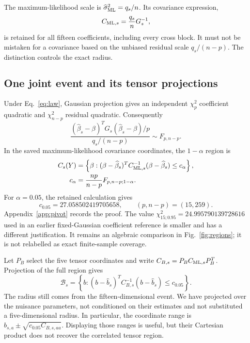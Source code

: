 The maximum-likelihood scale is $\widehat\sigma^2_{\rm ML}=q_s/n$. Its covariance expression,
\begin{equation}
 C_{{\rm ML},s}=\frac{q_s}{n}G_s^{-1},
 \label{eq:cml}
\end{equation}
is retained for all fifteen coefficients, including every cross block. It must not be mistaken for a covariance based on the unbiased residual scale $q_s/(n-p)$. The distinction controls the exact radius.

\subsection{One joint event and its tensor projections}

Under Eq.~\eqref{eq:law}, Gaussian projection gives an independent $\chi^2_p$ coefficient quadratic and $\chi^2_{n-p}$ residual quadratic. Consequently
\begin{equation}
 \frac{(\widehat\beta_s-\beta)^TG_s(\widehat\beta_s-\beta)/p}{q_s/(n-p)}
          \sim F_{p,n-p}.
 \label{eq:fpivot}
\end{equation}
In the saved maximum-likelihood covariance coordinates, the $1-\alpha$ region is
\begin{align}
 C_s(Y)&=\left\{\beta:(\beta-\widehat\beta_s)^TC_{{\rm ML},s}^{-1}
                   (\beta-\widehat\beta_s)\leq c_\alpha\right\},\nonumber\\
 c_\alpha&=\frac{np}{n-p}F_{p,n-p;1-\alpha}.
 \label{eq:finitef}
\end{align}
For $\alpha=0.05$, the retained calculation gives
\begin{equation}
 c_{0.05}=27.058502419705658,\qquad (p,n-p)=(15,259).
 \label{eq:radius}
\end{equation}
Appendix~\ref{app:pivot} records the proof. The value $\chi^2_{15;0.95}=24.995790139728616$ used in an earlier fixed-Gaussian coefficient reference is smaller and has a different justification. It remains an algebraic comparison in Fig.~\ref{fig:regions}; it is not relabelled as exact finite-sample coverage.

Let $P_B$ select the five tensor coordinates and write $C_{B,s}=P_BC_{{\rm ML},s}P_B^T$. Projection of the full region gives
\begin{equation}
 \mathcal B_s=\left\{b:(b-\widehat b_s)^TC_{B,s}^{-1}(b-\widehat b_s)
                                      \leq c_{0.05}\right\}.
 \label{eq:tensorregion}
\end{equation}
The radius still comes from the fifteen-dimensional event. We have projected over the nuisance parameters, not conditioned on their estimates and not substituted a five-dimensional radius. In particular, the coordinate range is $\widehat b_{s,a}\pm\sqrt{c_{0.05}C_{B,s,aa}}$. Displaying those ranges is useful, but their Cartesian product does not recover the correlated tensor region.

